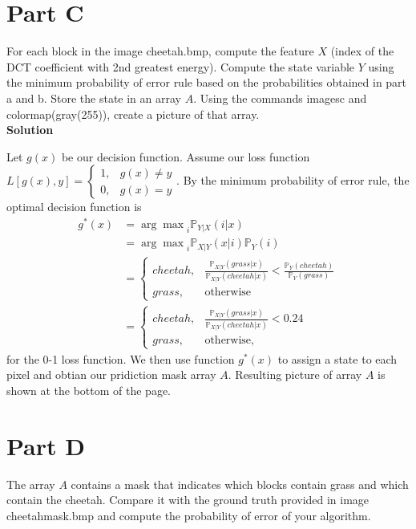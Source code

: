 \documentclass{article}
\newcommand*{\prob}{\mathds{P}}
\begin{document}
\pagebreak

\section*{Part C}

For each block in the image {\selectfont cheetah.bmp}, compute the feature $X$ (index of the DCT coefficient with
2nd greatest energy). Compute the state variable $Y$ using the minimum probability of error rule based
on the probabilities obtained in part a and b. Store the state in an array $A$. Using the commands {\selectfont imagesc} 
and {\selectfont colormap(gray(255))}, create a picture of that array. \\

\textbf{\large Solution}

Let $g(x)$ be our decision function. Assume our loss function 
$L[g(x), y] = \begin{cases}
  1, &g(x) \neq y \\
  0, &g(x) = y
\end{cases}$. 
By the minimum probability of error rule, the optimal decision function is
\begin{align*}
  g^*(x) 
  &= {\arg \max}_{i} \prob_{Y|X}(i | x) \\
  &= {\arg \max}_{i} \prob_{X|Y}(x | i)\prob_Y(i) \\
  &= \begin{cases}
    cheetah, &\frac{\prob_{X|Y}(grass | x)}{\prob_{X|Y}(cheetah | x)} < \frac{\prob_Y(cheetah)}{\prob_Y(grass)} \\
    grass, &\text{otherwise}
  \end{cases} \\
  &= \begin{cases}
    cheetah, &\frac{\prob_{X|Y}(grass | x)}{\prob_{X|Y}(cheetah | x)} < 0.24 \\
    grass, &\text{otherwise},
  \end{cases}
\end{align*}
for the 0-1 loss function. We then use function $g^*(x)$ to assign a state to each pixel and obtian 
our pridiction mask array $A$. Resulting picture of array $A$ is shown at the bottom of the page.

\section*{Part D}

The array $A$ contains a mask that indicates which blocks contain grass and which contain the
cheetah. Compare it with the ground truth provided in image {\selectfont cheetah\textunderscore mask.bmp} and compute the probability of error of your algorithm. \\
\end{document}
